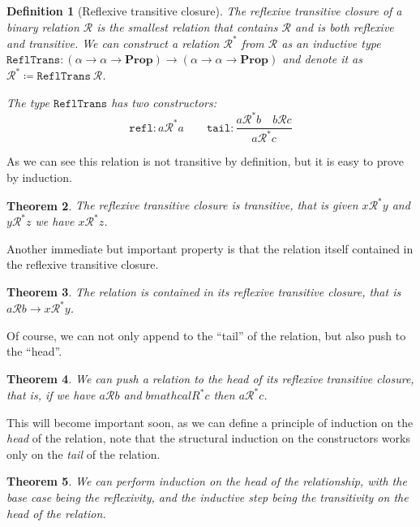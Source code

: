 \documentclass[
  a4paper, 
  10pt, 
  parskip=half, 
  DIV=20,
  toc=bibliography,
  usegeometry,
]{scrartcl}
\newtheorem{theorem}{Theorem}[section]
\newtheorem{definition}[theorem]{Definition}
\newcommand{\tyfont}[1]{\texttt{#1}}
\renewcommand{\implies}{\rightarrow}
\newcommand{\Prop}{\mathbf{Prop}}
\begin{document}
\begin{definition}[Reflexive transitive closure]
  The reflexive transitive closure of a binary relation \(\mathcal{R}\) is the smallest 
  relation that contains \(\mathcal{R}\) and is both reflexive and transitive. 
  We can construct a relation \(\mathcal{R}^*\) from \(\mathcal{R}\) as an inductive type
  \(\tyfont{ReflTrans}: (\alpha \to \alpha \to \Prop) \to
  (\alpha \to \alpha \to \Prop)\) and denote it as 
  \(\mathcal{R}^* \coloneqq \tyfont{ReflTrans} \ \mathcal{R}\).

  The type \(\tyfont{ReflTrans}\) has two constructors:
  \[
    \texttt{refl}: a \mathcal{R}^* a
    \qquad 
    \texttt{tail}: \frac{
      a \mathcal{R}^* b
      \quad b \mathcal{R} c
    }{a \mathcal{R}^* c}
  \]
\end{definition}

As we can see this relation is not transitive by definition, but it is easy
to prove by induction.

\begin{theorem}
  The reflexive transitive closure is transitive, that is given 
  \(x \mathcal{R}^* y\) and \(y \mathcal{R}^* z\) we have \(x \mathcal{R}^* z\).
\end{theorem}

Another immediate but important property is that the relation itself contained
in the reflexive transitive closure.

\begin{theorem}
  The relation is contained in its reflexive transitive closure, that is
  \(a \mathcal{R} b \implies x \mathcal{R}^* y\).
\end{theorem}

Of course, we can not only append to the \enquote{tail} of the relation, but also
push to the \enquote{head}.

\begin{theorem}
  We can push a relation to the head of its reflexive transitive closure, that is,
  if we have \(a \mathcal{R} b\) and \(b mathcal{R}^* c\) then
  \(a \mathcal{R}^* c\).
\end{theorem}

This will become important soon, as we can define a principle of induction
on the \emph{head} of the relation, note that the structural induction
on the constructors works only on the \emph{tail} of the relation.

\begin{theorem}
  We can perform induction on the \emph{head} of the relationship, with the base
  case being the reflexivity, and the inductive step being the transitivity on
  the \emph{head} of the relation.
\end{theorem}
\end{document}
